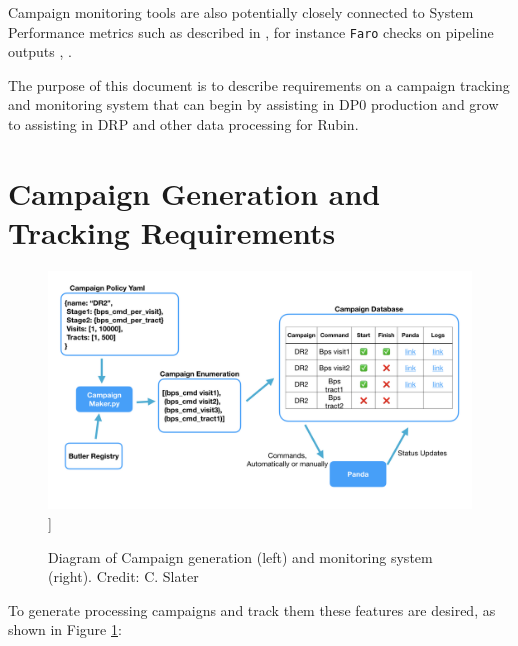 \documentclass[DM,authoryear,toc]{lsstdoc}
\begin{document}
Campaign monitoring tools are also potentially closely connected to
System Performance metrics such as described in \cite{DMTN-173}, 
for instance \texttt{Faro} checks on pipeline outputs \cite{DMTR-311}, \cite{FARO}.

The purpose of this document is to describe requirements on a campaign
tracking and monitoring system that can begin by assisting in DP0 
\cite{RTN-001} production and grow to assisting in DRP and other 
data processing for Rubin.

\section{Campaign Generation and Tracking Requirements}

\begin{figure}
\includegraphics[width=\textwidth]{CampaignTooling.jpg}]
\caption{Diagram of Campaign generation (left) and monitoring system (right).
Credit: C. Slater}
\label{CampaignTooling}
\end{figure}

To generate processing campaigns and track them these features are desired,
as shown in Figure \ref{CampaignTooling}:
\end{document}
